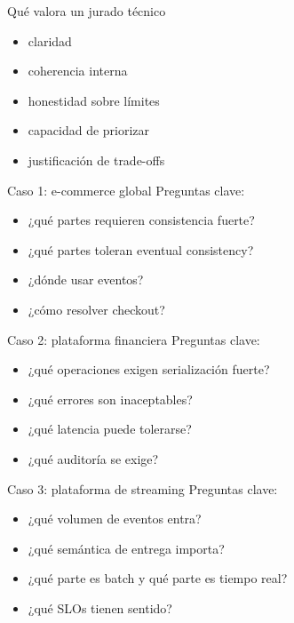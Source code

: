 \documentclass[institutional,screen,none]{ua-engineering-v6-beamer}
\begin{document}
\begin{frame}{Qué valora un jurado técnico}
\begin{itemize}
\item claridad
\item coherencia interna
\item honestidad sobre límites
\item capacidad de priorizar
\item justificación de trade-offs
\end{itemize}
\end{frame}


\begin{frame}{Caso 1: e-commerce global}
Preguntas clave:
\begin{itemize}
\item ¿qué partes requieren consistencia fuerte?
\item ¿qué partes toleran eventual consistency?
\item ¿dónde usar eventos?
\item ¿cómo resolver checkout?
\end{itemize}
\end{frame}

\begin{frame}{Caso 2: plataforma financiera}
Preguntas clave:
\begin{itemize}
\item ¿qué operaciones exigen serialización fuerte?
\item ¿qué errores son inaceptables?
\item ¿qué latencia puede tolerarse?
\item ¿qué auditoría se exige?
\end{itemize}
\end{frame}

\begin{frame}{Caso 3: plataforma de streaming}
Preguntas clave:
\begin{itemize}
\item ¿qué volumen de eventos entra?
\item ¿qué semántica de entrega importa?
\item ¿qué parte es batch y qué parte es tiempo real?
\item ¿qué SLOs tienen sentido?
\end{itemize}
\end{frame}

\end{document}
